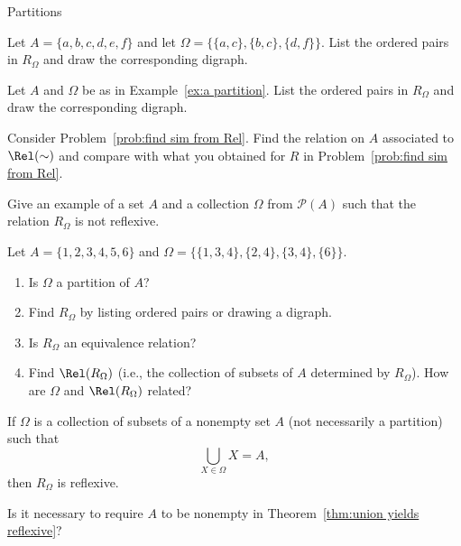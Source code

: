 \begin{section}{Partitions}
\begin{problem}
Let $A=\{a,b,c,d,e,f\}$ and let $\Omega=\{\{a,c\},\{b,c\},\{d,f\}\}$.  List the ordered pairs in $R_{\Omega}$ and draw the corresponding digraph.
\end{problem}

\begin{problem}
Let $A$ and $\Omega$ be as in Example~\ref{ex:a partition}. List the ordered pairs in $R_{\Omega}$ and draw the corresponding digraph.
\end{problem}

\begin{problem}
Consider Problem~\ref{prob:find sim from Rel}. Find the relation on $A$ associated to $\Rel(\sim)$ and compare with what you obtained for $R$ in Problem~\ref{prob:find sim from Rel}.
\end{problem}

\begin{problem}
Give an example of a set $A$ and a collection $\Omega$ from $\mathcal{P}(A)$ such that the relation $R_{\Omega}$ is not reflexive.
\end{problem}

\begin{problem}
Let $A=\{1,2,3,4,5,6\}$ and $\Omega=\{\{1,3,4\},\{2,4\},\{3,4\},\{6\}\}$. 
\begin{enumerate}[label=\textrm{(\alph*)}]
\item Is $\Omega$ a partition of $A$?
\item Find $R_{\Omega}$ by listing ordered pairs or drawing a digraph.
\item Is $R_{\Omega}$ an equivalence relation?
\item Find $\Rel(R_\Omega)$ (i.e., the collection of subsets of $A$ determined by $R_{\Omega}$). How are $\Omega$ and $\Rel(R_\Omega)$ related?
\end{enumerate}
\end{problem}

\begin{theorem}\label{thm:union yields reflexive}
If $\Omega$ is a collection of subsets of a nonempty set $A$ (not necessarily a partition) such that
\[
\bigcup_{X\in\Omega}X=A,
\]
then $R_{\Omega}$ is reflexive.
\end{theorem}

\begin{problem}
Is it necessary to require $A$ to be nonempty in Theorem~\ref{thm:union yields reflexive}?
\end{problem}


\end{section}
